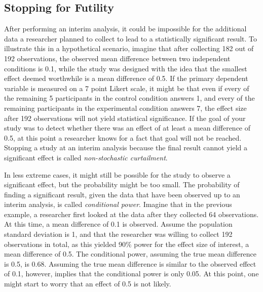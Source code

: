 \documentclass[
  english,
  ,man,floatsintext]{apa6}
\begin{document}
\hypertarget{stopping-for-futility}{%
\subsection{Stopping for Futility}\label{stopping-for-futility}}

After performing an interim analysis, it could be impossible for the additional data a researcher planned to collect to lead to a statistically significant result. To illustrate this in a hypothetical scenario, imagine that after collecting 182 out of 192 observations, the observed mean difference between two independent conditions is 0.1, while the study was designed with the idea that the smallest effect deemed worthwhile is a mean difference of 0.5. If the primary dependent variable is measured on a 7 point Likert scale, it might be that even if every of the remaining 5 participants in the control condition answers 1, and every of the remaining participants in the experimental condition answers 7, the effect size after 192 observations will not yield statistical significance. If the goal of your study was to detect whether there was an effect of at least a mean difference of 0.5, at this point a researcher knows for a fact that goal will not be reached. Stopping a study at an interim analysis because the final result cannot yield a significant effect is called \emph{non-stochastic curtailment}.

In less extreme cases, it might still be possible for the study to observe a significant effect, but the probability might be too small. The probability of finding a significant result, given the data that have been observed up to an interim analysis, is called \emph{conditional power}. Imagine that in the previous example, a researcher first looked at the data after they collected 64 observations. At this time, a mean difference of 0.1 is observed. Assume the population standard deviation is 1, and that the researcher was willing to collect 192 observations in total, as this yielded 90\% power for the effect size of interest, a mean difference of 0.5. The conditional power, assuming the true mean difference is 0.5, is 0.68. Assuming the true mean difference is similar to the observed effect of 0.1, however, implies that the conditional power is only 0.05. At this point, one might start to worry that an effect of 0.5 is not likely.
\end{document}
